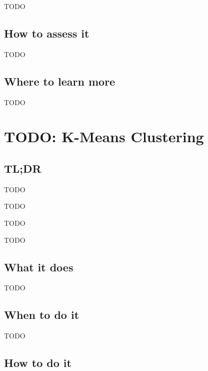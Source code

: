 \documentclass[
]{book}
\providecommand{\tightlist}{%
  \setlength{\itemsep}{0pt}\setlength{\parskip}{0pt}}
\begin{document}
TODO

\hypertarget{how-to-assess-it-21}{%
\section{How to assess it}\label{how-to-assess-it-21}}

TODO

\hypertarget{where-to-learn-more-21}{%
\section{Where to learn more}\label{where-to-learn-more-21}}

TODO

\hypertarget{k-means-clustering}{%
\chapter{TODO: K-Means Clustering}\label{k-means-clustering}}

\hypertarget{tldr-22}{%
\section{TL;DR}\label{tldr-22}}

\begin{description}
\tightlist
\item[What it does]
TODO
\item[When to do it]
TODO
\item[How to do it]
TODO
\item[How to assess it]
TODO
\end{description}

\hypertarget{what-it-does-22}{%
\section{What it does}\label{what-it-does-22}}

TODO

\hypertarget{when-to-do-it-22}{%
\section{When to do it}\label{when-to-do-it-22}}

TODO

\hypertarget{how-to-do-it-22}{%
\section{How to do it}\label{how-to-do-it-22}}
\end{document}
